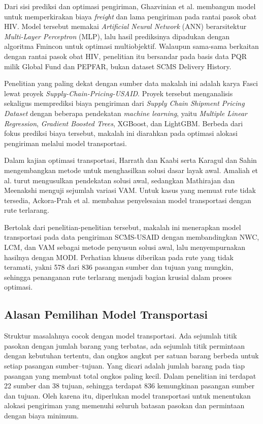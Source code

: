 \documentclass[a4paper,11pt]{article}
\begin{document}
Dari sisi prediksi dan optimasi pengiriman, Ghazvinian et al. \cite{ghazvinian2025} membangun model untuk memperkirakan biaya \textit{freight} dan lama pengiriman pada rantai pasok obat HIV. Model tersebut memakai \textit{Artificial Neural Network} (ANN) berarsitektur \textit{Multi-Layer Perceptron} (MLP), lalu hasil prediksinya dipadukan dengan algoritma Fmincon untuk optimasi multiobjektif. Walaupun sama-sama berkaitan dengan rantai pasok obat HIV, penelitian itu bersandar pada basis data PQR milik Global Fund dan PEPFAR, bukan dataset SCMS Delivery History.

Penelitian yang paling dekat dengan sumber data makalah ini adalah karya Fasci \cite{fasci} lewat proyek \textit{Supply-Chain-Pricing-USAID}. Proyek tersebut menganalisis sekaligus memprediksi biaya pengiriman dari \textit{Supply Chain Shipment Pricing Dataset} dengan beberapa pendekatan \textit{machine learning}, yaitu \textit{Multiple Linear Regression}, \textit{Gradient Boosted Trees}, XGBoost, dan LightGBM. Berbeda dari fokus prediksi biaya tersebut, makalah ini diarahkan pada optimasi alokasi pengiriman melalui model transportasi.

Dalam kajian optimasi transportasi, Harrath dan Kaabi \cite{harrath2018} serta Karagul dan Sahin \cite{karagul2020} mengembangkan metode untuk menghasilkan solusi dasar layak awal. Amaliah et al. \cite{amaliah2022a,amaliah2022b} turut mengusulkan pendekatan solusi awal, sedangkan Mathirajan dan Meenakshi \cite{mathirajan2004} menguji sejumlah variasi VAM. Untuk kasus yang memuat rute tidak tersedia, Ackora-Prah et al. \cite{ackoraprah2022} membahas penyelesaian model transportasi dengan rute terlarang.

Bertolak dari penelitian-penelitian tersebut, makalah ini menerapkan model transportasi pada data pengiriman SCMS-USAID dengan membandingkan NWC, LCM, dan VAM sebagai metode penyusun solusi awal, lalu menyempurnakan hasilnya dengan MODI. Perhatian khusus diberikan pada rute yang tidak teramati, yakni 578 dari 836 pasangan sumber dan tujuan yang mungkin, sehingga penanganan rute terlarang menjadi bagian krusial dalam proses optimasi.


\subsection{Alasan Pemilihan Model Transportasi}
Struktur masalahnya cocok dengan model transportasi. Ada sejumlah titik pasokan dengan jumlah barang yang terbatas, ada sejumlah titik permintaan dengan kebutuhan tertentu, dan ongkos angkut per satuan barang berbeda untuk setiap pasangan sumber--tujuan. Yang dicari adalah jumlah barang pada tiap pasangan yang membuat total ongkos paling kecil. Dalam penelitian ini terdapat 22 sumber dan 38 tujuan, sehingga terdapat 836 kemungkinan pasangan sumber dan tujuan. Oleh karena itu, diperlukan model transportasi untuk menentukan alokasi pengiriman yang memenuhi seluruh batasan pasokan dan permintaan dengan biaya minimum.
\end{document}
